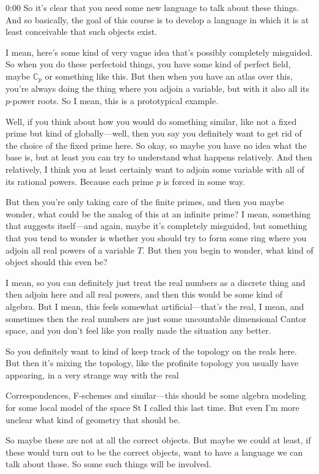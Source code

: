 \begin{unfinished}{0:00}
So it's clear that you need some new language to talk about these things. And so basically, the goal of this course is to develop a language in which it is at least conceivable that such objects exist.

I mean, here's some kind of very vague idea that's possibly completely misguided. So when you do these perfectoid things, you have some kind of perfect field, maybe $\mathbb{C}_p$ or something like this. But then when you have an atlas over this, you're always doing the thing where you adjoin a variable, but with it also all its $p$-power roots. So I mean, this is a prototypical example.

Well, if you think about how you would do something similar, like not a fixed prime but kind of globally---well, then you say you definitely want to get rid of the choice of the fixed prime here. So okay, so maybe you have no idea what the base is, but at least you can try to understand what happens relatively. And then relatively, I think you at least certainly want to adjoin some variable with all of its rational powers. Because each prime $p$ is forced in some way.

But then you're only taking care of the finite primes, and then you maybe wonder, what could be the analog of this at an infinite prime? I mean, something that suggests itself---and again, maybe it's completely misguided, but something that you tend to wonder is whether you should try to form some ring where you adjoin all real powers of a variable $T$. But then you begin to wonder, what kind of object should this even be?

I mean, so you can definitely just treat the real numbers as a discrete thing and then adjoin here and all real powers, and then this would be some kind of algebra. But I mean, this feels somewhat artificial---that's the real, I mean, and sometimes then the real numbers are just some uncountable dimensional Cantor space, and you don't feel like you really made the situation any better.

So you definitely want to kind of keep track of the topology on the reals here. But then it's mixing the topology, like the profinite topology you usually have appearing, in a very strange way with the real

Correspondences, F-schemes and similar---this should be some algebra modeling for some local model of the space St I called this last time. But even I'm more unclear what kind of geometry that should be.

So maybe these are not at all the correct objects. But maybe we could at least, if these would turn out to be the correct objects, want to have a language we can talk about those. So some such things will be involved.


\end{unfinished}
